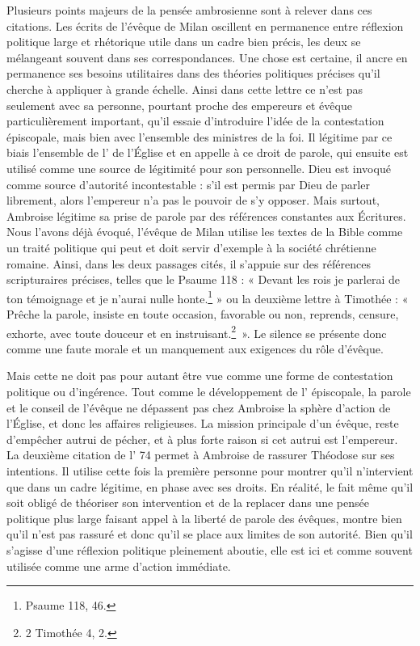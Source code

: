 \bigskip

Plusieurs points majeurs de la pensée ambrosienne sont à relever dans ces citations. Les écrits de l'évêque de Milan oscillent en permanence entre réflexion politique large et rhétorique utile dans un cadre bien précis, les deux se mélangeant souvent dans ses correspondances. Une chose est certaine, il ancre en permanence ses besoins utilitaires dans des théories politiques précises qu'il cherche à appliquer à grande échelle. Ainsi dans cette lettre ce n'est pas seulement avec sa personne, pourtant proche des empereurs et évêque particulièrement important, qu'il essaie d'introduire l'idée de la contestation épiscopale, mais bien avec l'ensemble des ministres de la foi. Il légitime par ce biais l'ensemble de l' de l'Église et en appelle à ce droit de parole, qui ensuite est utilisé comme une source de légitimité pour son  personnelle. Dieu est invoqué comme source d'autorité incontestable : s'il est permis par Dieu de parler librement, alors l'empereur n'a pas le pouvoir de s'y opposer. Mais surtout, Ambroise légitime sa prise de parole par des références constantes aux Écritures. Nous l'avons déjà évoqué, l'évêque de Milan utilise les textes de la Bible comme un traité politique qui peut et doit servir d'exemple à la société chrétienne romaine. Ainsi, dans les deux passages cités, il s'appuie sur des références scripturaires précises, telles que le Psaume 118 : « Devant les rois je parlerai de ton témoignage et je n'aurai nulle honte.\footnote{Psaume 118, 46.} » ou la deuxième lettre à Timothée : « Prêche la parole, insiste en toute occasion, favorable ou non, reprends, censure, exhorte, avec toute douceur et en instruisant.\footnote{2 Timothée 4, 2.}~». Le silence se présente donc comme une faute morale et un manquement aux exigences du rôle d'évêque.

\bigskip

Mais cette  ne doit pas pour autant être vue comme une forme de contestation politique ou d'ingérence. Tout comme le développement de l' épiscopale, la parole et le conseil de l'évêque ne dépassent pas chez Ambroise la sphère d'action de l'Église, et donc les affaires religieuses. La mission principale d'un évêque, reste d'empêcher autrui de pécher, et à plus forte raison si cet autrui est l'empereur. La deuxième citation de l' 74 permet à Ambroise de rassurer Théodose sur ses intentions. Il utilise cette fois la première personne pour montrer qu'il n'intervient que dans un cadre légitime, en phase avec ses droits. En réalité, le fait même qu'il soit obligé de théoriser son intervention et de la replacer dans une pensée politique plus large faisant appel à la liberté de parole des évêques, montre bien qu'il n'est pas rassuré et donc qu'il se place aux limites de son autorité. Bien qu'il s'agisse d'une réflexion politique pleinement aboutie, elle est ici et comme souvent utilisée comme une arme d'action immédiate.

